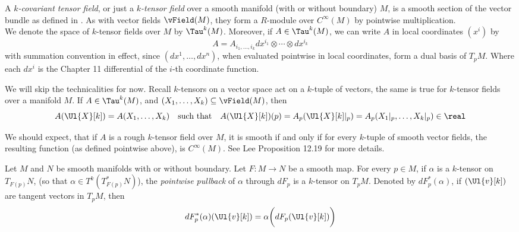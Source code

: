 \documentclass[../main-v2-manifolds.tex]{subfiles}
\begin{document}
\begin{definition}
    A \emph{$k$-covariant tensor field}, or just a \emph{$k$-tensor field} over a smooth manifold (with or without boundary) $M$, is a smooth section of the vector bundle as defined in . As with vector fields $\vField(M)$, they form a $R$-module over $C^\infty(M)$ by pointwise multiplication.\\

    We denote the space of $k$-tensor fields over $M$ by $\Tau^k(M)$. Moreover, if $A\in \Tau^k(M)$, we can write $A$ in local coordinates $(x^i)$ by
    \[
        A = A_{i_1,\ldots,i_k}dx^{i_1}\otimes\cdots\otimes dx^{i_k}
    \]
    with summation convention in effect, since $(dx^{1},\ldots,dx^{n})$, when evaluated pointwise in local coordinates, form a dual basis of $T_pM$. Where each $dx^i$ is the Chapter 11 differential of the $i$-th coordinate function.
\end{definition}
We will skip the technicalities for now. Recall $k$-tensors on a vector space act on a $k$-tuple of vectors, the same is true for $k$-tensor fields over a manifold $M$. If $A\in \Tau^k(M)$, and $(X_1,\ldots, X_k)\subseteq\vField(M)$, then
\[
    A(\Ul{X}[k]) = A(X_1,\ldots,X_k)\quad\text{such that}\quad A(\Ul{X}[k])(p) = A_p(\Ul{X}[k]\vert_{p}) = A_p(X_1\vert_{p},\ldots,X_k\vert_{p})\in\real
\]

We should expect, that if $A$ is a rough $k$-tensor field over $M$, it is smooth if and only if for every $k$-tuple of smooth vector fields, the resulting function (as defined pointwise above), is $C^\infty(M)$. See Lee Proposition 12.19 for more details.


\begin{definition}
    Let $M$ and $N$ be smooth manifolds with or without boundary. Let $F:M\to N$ be a smooth map. For every $p\in M$, if $\alpha$ is a $k$-tensor on $T_{F(p)}N$, (so that $\alpha\in T^k(T_{F(p)}^*N)$), the \emph{pointwise pullback} of $\alpha$ through $dF_p$ is a $k$-tensor on $T_p M$. Denoted by $dF^*_p(\alpha)$, if $(\Ul{v}[k])$ are tangent vectors in $T_pM$, then
    \begin{equation}\label{tensor-field-pointwise-pullback-eq}
        dF^*_p(\alpha)(\Ul{v}[k]) = \alpha\biggl(dF_p(\Ul{v}[k])\biggr)
    \end{equation}
\end{definition}
\end{document}

